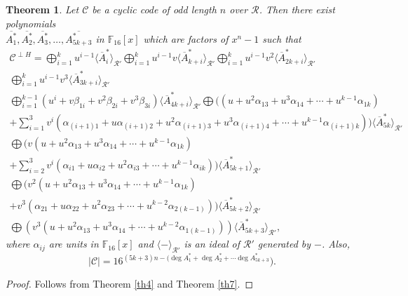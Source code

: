 \documentclass{amsart}
\newtheorem{theorem}{Theorem}[section]
\theoremstyle{definition}
\theoremstyle{remark}
\numberwithin{equation}{section}
\begin{document}
\begin{theorem}\label{th8}
		Let $\mathcal{C}$ be a cyclic code of odd length $n$ over $\mathcal{R}$. Then there exist polynomials \\
		$\overline{A_1^*}, \overline{A_2^*}, \overline{A_3^*}, \dots , \overline{A_{5k+3}^*}$ in $\mathbb F_{16}[x]$ which are factors of $x^n-1$ such that
 \allowdisplaybreaks\begin{gather*}
		\mathcal{C}^{\perp H} = \bigoplus_{i=1}^{k} u^{i-1}\langle \overline{A}_{i}^*\rangle_{\mathcal{R}'}
  \bigoplus_{i=1}^{k} u^{i-1}v\langle \overline{A}_{k+i}^*\rangle_{\mathcal{R}'} \bigoplus_{i=1}^{k} u^{i-1}v^2\langle \overline{A}_{2k+i}^*\rangle_{\mathcal{R}'} \\ \bigoplus_{i=1}^{k} u^{i-1}v^3\langle \overline{A}_{3k+i}^*\rangle_{\mathcal{R}'}
       \\ \bigoplus_{i=1}^{k-1} (u^i+ v\beta_{1i} + v^2\beta_{2i} + v^3\beta_{3i}) \langle \overline{A}_{4k+i}^*\rangle_{\mathcal{R}'} \bigoplus ((u + u^2\alpha_{13} + u^3\alpha_{14} + \cdots + u^{k-1}\alpha_{1k})
     \\ + \sum_{i=1}^{3} v^i( \alpha_{(i+1)1} + u\alpha_{(i+1)2} + u^2\alpha_{(i+1)3} + u^3\alpha_{(i+1)4} + \cdots + u^{k-1}\alpha_{(i+1)k} ))\langle \overline{A}_{5k}^*\rangle_{\mathcal{R}'}
     \\  \bigoplus   (v(u + u^2\alpha_{13} + u^3\alpha_{14} + \cdots + u^{k-1}\alpha_{1k})
     \\ + \sum_{i=2}^{3} v^i( \alpha_{i1} + u\alpha_{i2} + u^2\alpha_{i3} + \cdots + u^{k-1}\alpha_{ik} ))\langle \overline{A}_{5k+1}^*\rangle_{\mathcal{R}'}
     \\  \bigoplus  (v^2(u + u^2\alpha_{13} + u^3\alpha_{14} + \cdots + u^{k-1}\alpha_{1k})
      \\ + v^3( \alpha_{21} + u\alpha_{22} + u^2\alpha_{23} + \cdots + u^{k-2}\alpha_{2(k-1)}))\langle \overline{A}_{5k+2}^*\rangle_{\mathcal{R}'}
     \\  \bigoplus  (v^3(u + u^2\alpha_{13} + u^3\alpha_{14} + \cdots + u^{k-2}\alpha_{1(k-1)}))\langle \overline{A}_{5k+3}^*\rangle_{\mathcal{R}'},
		\end{gather*}		
where $\alpha_{ij} $ are units in $\mathbb F_{16}[x]$ and $\langle - \rangle_{\mathcal{R}'} $ is an ideal of $\mathcal{R}'$ generated by $-$. Also,
		$$|\mathcal{C}|=16^{(5k+3)n-(\deg A_1^*+\deg A_2^*+ \cdots \deg A_{5k+3}^* }).$$

	\end{theorem}
 \begin{proof}
     Follows from Theorem \ref{th4} and Theorem \ref{th7}.
     
 \end{proof}
\end{document}
